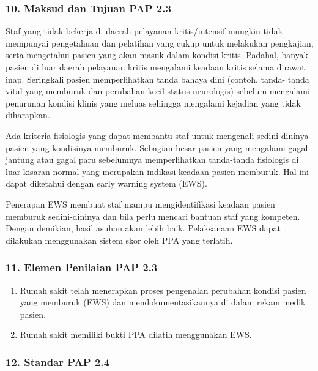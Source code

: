 \documentclass[
]{book}
\providecommand{\tightlist}{%
  \setlength{\itemsep}{0pt}\setlength{\parskip}{0pt}}
\begin{document}
\hypertarget{maksud-dan-tujuan-pap-2.3}{%
\subsubsection*{10. Maksud dan Tujuan PAP 2.3}\label{maksud-dan-tujuan-pap-2.3}}

Staf yang tidak bekerja di daerah pelayanan kritis/intensif mungkin tidak mempunyai pengetahuan dan pelatihan yang cukup untuk melakukan pengkajian, serta mengetahui pasien yang akan masuk dalam kondisi kritis. Padahal, banyak pasien di luar daerah pelayanan kritis mengalami keadaan kritis selama dirawat inap. Seringkali pasien memperlihatkan tanda bahaya dini (contoh, tanda- tanda vital yang memburuk dan perubahan kecil status neurologis) sebelum mengalami penurunan kondisi klinis yang meluas sehingga mengalami kejadian yang tidak diharapkan.

Ada kriteria fisiologis yang dapat membantu staf untuk mengenali sedini-dininya pasien yang kondisinya memburuk. Sebagian besar pasien yang mengalami gagal jantung atau gagal paru sebelumnya memperlihatkan tanda-tanda fisiologis di luar kisaran normal yang merupakan indikasi keadaan pasien memburuk. Hal ini dapat diketahui dengan early warning system (EWS).

Penerapan EWS membuat staf mampu mengidentifikasi keadaan pasien memburuk sedini-dininya dan bila perlu mencari bantuan staf yang kompeten. Dengan demikian, hasil asuhan akan lebih baik. Pelaksanaan EWS dapat dilakukan menggunakan sistem skor oleh PPA yang terlatih.

\hypertarget{elemen-penilaian-pap-2.3}{%
\subsubsection*{11. Elemen Penilaian PAP 2.3}\label{elemen-penilaian-pap-2.3}}

\begin{enumerate}
\def\labelenumi{\alph{enumi}.}
\tightlist
\item
  Rumah sakit telah menerapkan proses pengenalan perubahan kondisi pasien yang memburuk (EWS) dan mendokumentasikannya di dalam rekam medik pasien.
\item
  Rumah sakit memiliki bukti PPA dilatih menggunakan EWS.
\end{enumerate}

\hypertarget{standar-pap-2.4}{%
\subsubsection*{12. Standar PAP 2.4}\label{standar-pap-2.4}}
\end{document}
